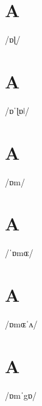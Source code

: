 \documentclass[10pt,a4paper,twoside]{book}
\begin{document}
\section*{A}

\begin{multicols}{3}
 {/ɒɭ/} {}
\end{multicols}

\section*{A}

\begin{multicols}{3}
 {/ɒˈɭɒǀ/} {}
\end{multicols}

\section*{A}

\begin{multicols}{3}
 {/ɒm/} {}
\end{multicols}

\section*{A}

\begin{multicols}{3}
 {/ˈɒmɶ/} {}
\end{multicols}

\section*{A}

\begin{multicols}{3}
 {/ɒmɶˈʌ/} {}
\end{multicols}

\section*{A}

\begin{multicols}{3}
 {/ɒmˈgɒ/} {}
\end{multicols}
\end{document}
